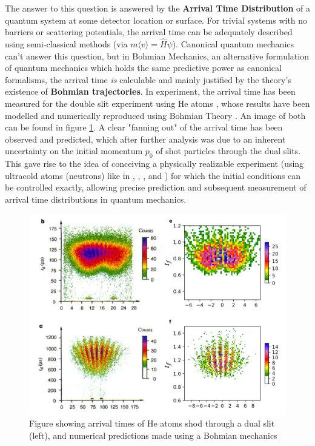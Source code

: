 The answer to this question is answered by the \textbf{Arrival Time Distribution} of a quantum system at some detector location or surface. For trivial systems with no barriers or scattering potentials, the arrival time can be adequately described using semi-classical methods (via $m\langle v\rangle=\hat{H} \psi$). Canonical quantum mechanics can't answer this question, but in Bohmian Mechanics, an alternative formulation of quantum mechanics which holds the same predictive power as canonical formalisms, the arrival time \textit{is} calculable and mainly justified by the theory's existence of \textbf{Bohmian trajectories}. In experiment, the arrival time has been measured for the double slit experiment using He atoms \cite{kurtsiefer1997measurement}, whose results have been modelled and numerically reproduced using Bohmian Theory \cite{DAS2025170054} \cite{das2022double}. An image of both can be found in figure \ref{fig:doubleslit_main_results}. A clear "fanning out" of the arrival time has been observed and predicted, which after further analysis was due to an inherent uncertainty on the initial momentum $p_0$ of shot particles through the dual slits. This gave rise to the idea of conceiving a physically realizable experiment (using ultracold atoms (neutrons) like in \cite{vincent2009quantumtrampolineultracoldatoms}, \cite{Debu:2861358}, \cite{Zakharov_2016}, and \cite{KULIN201538}) for which the initial conditions can be controlled exactly, allowing precise prediction and subsequent measurement of arrival time distributions in quantum mechanics.

\begin{figure}
    \centering
    \includegraphics[width=1\linewidth]{Figures/bohmiandubbleslitexp.png}
    \caption{Figure showing arrival times of He atoms shod through a dual slit (left), and numerical predictions made using a Bohmian mechanics \cite{DAS2025170054}}
    \label{fig:doubleslit_main_results}
\end{figure}

